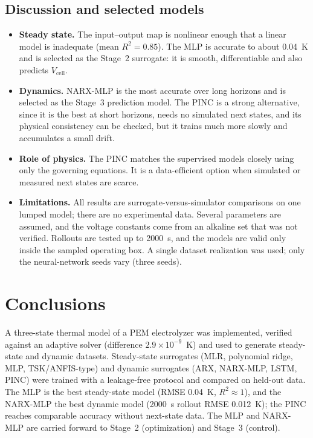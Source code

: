 \documentclass[11pt,a4paper]{article}
\newcommand{\Vcell}{V_{\mathrm{cell}}}
\newcommand{\tab}[1]{}
\begin{document}
\begin{table}[H]
\centering\small
\caption{Rollout RMSE (K) on clean and noisy test data.}\label{tab:noise}
\tab{dyn_noise_metrics}
\end{table}

\subsection{Discussion and selected models}
\begin{itemize}
  \item \textbf{Steady state.} The input--output map is nonlinear enough that a linear model is inadequate (mean $R^2=0.85$). The MLP is accurate to about 0.04~K and is selected as the Stage~2 surrogate: it is smooth, differentiable and also predicts $\Vcell$.
  \item \textbf{Dynamics.} NARX-MLP is the most accurate over long horizons and is selected as the Stage~3 prediction model. The PINC is a strong alternative, since it is the best at short horizons, needs no simulated next states, and its physical consistency can be checked, but it trains much more slowly and accumulates a small drift.
  \item \textbf{Role of physics.} The PINC matches the supervised models closely using only the governing equations. It is a data-efficient option when simulated or measured next states are scarce.
  \item \textbf{Limitations.} All results are surrogate-versus-simulator comparisons on one lumped model; there are no experimental data. Several parameters are assumed, and the voltage constants come from an alkaline set that was not verified. Rollouts are tested up to 2000~s, and the models are valid only inside the sampled operating box. A single dataset realization was used; only the neural-network seeds vary (three seeds).
\end{itemize}

\section{Conclusions}
A three-state thermal model of a PEM electrolyzer was implemented, verified against an adaptive solver (difference $2.9\times10^{-9}$~K) and used to generate steady-state and dynamic datasets. Steady-state surrogates (MLR, polynomial ridge, MLP, TSK/ANFIS-type) and dynamic surrogates (ARX, NARX-MLP, LSTM, PINC) were trained with a leakage-free protocol and compared on held-out data. The MLP is the best steady-state model (RMSE 0.04~K, $R^2\approx1$), and the NARX-MLP the best dynamic model (2000~s rollout RMSE 0.012~K); the PINC reaches comparable accuracy without next-state data. The MLP and NARX-MLP are carried forward to Stage~2 (optimization) and Stage~3 (control).
\end{document}
